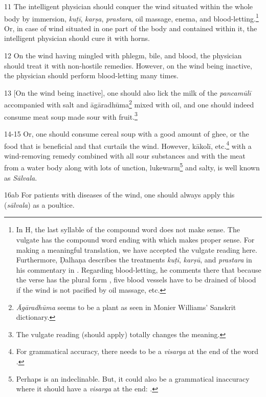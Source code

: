 \begin{translation}
    \item[11]
    The intelligent physician should conquer the wind situated within the whole body by immersion, \textit{kuṭī}, \textit{karṣa}, \textit{prastara}, oil massage, enema, and blood-letting.\footnote{In H, the last syllable  of the compound word does not make sense. The vulgate has the compound word ending with  which makes proper sense. For making a meaningful translation, we have accepted the vulgate reading here. Furthermore, Ḍalhaṇa describes the treatments \textit{kuṭī}, \textit{karṣū}, and \textit{prastara} in his commentary in \citep[421]{vulgate}. Regarding blood-letting, he comments there that because the verse has the plural form , five blood vessels have to be drained of blood if the wind is not pacified by oil massage, etc.} Or, in case of wind situated in one part of the body and contained within it, the intelligent physician should cure it with horns. 

    \item[12]
    On the wind having mingled with phlegm, bile, and blood, the physician should treat it with non-hostile remedies. However, on the wind being inactive, the physician should perform blood-letting many times. 

    \item[13]
    [On the wind being inactive], one should also lick the milk of the \emph{pancamūlī} accompanied with salt and \gls{āgāradhūma}\footnote{\emph{Āgāradhūma} seems to be a plant as seen in Monier Williams' Sanskrit dictionary.} mixed with oil, and one should indeed consume meat soup made sour with fruit.\footnote{The vulgate reading  (should apply) totally changes the meaning.}

    \item[14-15]
    Or, one should consume cereal soup with a good amount of ghee, or the food that is beneficial and that curtails the wind. However, \gls{kākolī}, etc.\footnote{For grammatical accuracy, there needs to be a \emph{visarga} at the end of the word .} with a wind-removing remedy combined with all sour substances and with the meat from a water body along with lots of unction, lukewarm\footnote{Perhaps  is an indeclinable. But, it could also be a grammatical inaccuracy where it should have a \textit{visarga} at the end: .} and salty, is well known as \textit{Sālvala}.    

    \item[16ab]
    For patients with diseases of the wind, one should always apply this (\textit{sālvala}) as a poultice.
    

\end{translation}
